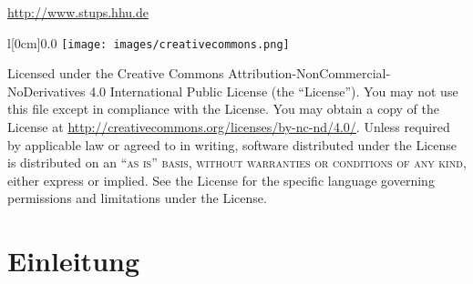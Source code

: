 \documentclass[11pt,oneside]{book} %
\begin{document}

\noindent \url{http://www.stups.hhu.de}\\ %

\noindent
\begin{wrapfigure}[4]{l}[0cm]{0.0\textwidth}
\texttt{[image: images/creativecommons.png]}
\end{wrapfigure}
 Licensed under the Creative Commons Attribution-NonCommercial-NoDerivatives 4.0 International Public License (the ``License''). You may not use this file except in compliance with the License. You may obtain a copy of the License at \url{http://creativecommons.org/licenses/by-nc-nd/4.0/}. Unless required by applicable law or agreed to in writing, software distributed under the License is distributed on an \textsc{``as is'' basis, without warranties or conditions of any kind}, either express or implied. See the License for the specific language governing permissions and limitations under the License.\\ %





\pagestyle{empty} %

\tableofcontents %


\pagestyle{fancy} %

\part{Einleitung}


\end{document}

